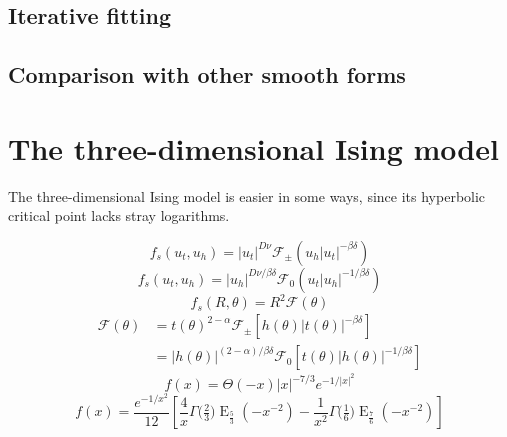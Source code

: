 \documentclass[
  aps,
  pre,
  reprint,
  longbibliography,
  floatfix
]{revtex4-2}
\begin{document}
\subsection{Iterative fitting}

\subsection{Comparison with other smooth forms}

\section{The three-dimensional Ising model}

\cite{Butera_2011_Free}

The three-dimensional Ising model is easier in some ways, since its hyperbolic critical point lacks stray logarithms.

\begin{equation} \label{eq:free.energy.3d.low}
  f_s(u_t, u_h)
  = |u_t|^{D\nu}\mathcal F_{\pm}(u_h|u_t|^{-\beta\delta})
\end{equation}
\begin{equation} \label{eq:free.energy.3d.mid}
  f_s(u_t, u_h)
  = |u_h|^{D\nu/\beta\delta}\mathcal F_0(u_t|u_h|^{-1/\beta\delta})
\end{equation}
\begin{equation} \label{eq:schofield.3d.free.energy}
  f_s(R, \theta) = R^2\mathcal F(\theta)
\end{equation}
\begin{equation} \label{eq:scaling.function.equivalences.3d}
  \begin{aligned}
    \mathcal F(\theta)
    &=t(\theta)^{2-\alpha}\mathcal F_\pm\left[h(\theta)|t(\theta)|^{-\beta\delta}\right] \\
    &=|h(\theta)|^{(2-\alpha)/\beta\delta}\mathcal F_0\left[t(\theta)|h(\theta)|^{-1/\beta\delta}\right]
  \end{aligned}
\end{equation}
\begin{equation} \label{eq:im.f.func.3d}
  f(x)=\Theta(-x) |x|^{-7/3} e^{-1/|x|^2}
\end{equation}
\begin{equation}
  f(x)=\frac{e^{-1/x^2}}{12}\left[
    \frac4x\Gamma\big(\tfrac23\big)\operatorname{E}_{\frac53}(-x^{-2})
    -\frac1{x^2}\Gamma\big(\tfrac16\big)\operatorname{E}_{\frac76}(-x^{-2})
  \right]
\end{equation}
\end{document}
